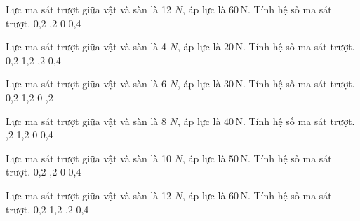 \begin{ex}
Lực ma sát trượt giữa vật và sàn là 12 $N$, áp lực là $60\,\text{N}$. Tính hệ số ma sát trượt.
\choice
{0,2}
{,2}
{0}
{0,4}
\end{ex}

\begin{ex}
Lực ma sát trượt giữa vật và sàn là 4 $N$, áp lực là $20\,\text{N}$. Tính hệ số ma sát trượt.
\choice
{0,2}
{1,2}
{,2}
{0,4}
\end{ex}

\begin{ex}
Lực ma sát trượt giữa vật và sàn là 6 $N$, áp lực là $30\,\text{N}$. Tính hệ số ma sát trượt.
\choice
{0,2}
{1,2}
{0}
{,2}
\end{ex}

\begin{ex}
Lực ma sát trượt giữa vật và sàn là 8 $N$, áp lực là $40\,\text{N}$. Tính hệ số ma sát trượt.
\choice
{,2}
{1,2}
{0}
{0,4}
\end{ex}

\begin{ex}
Lực ma sát trượt giữa vật và sàn là 10 $N$, áp lực là $50\,\text{N}$. Tính hệ số ma sát trượt.
\choice
{0,2}
{,2}
{0}
{0,4}
\end{ex}

\begin{ex}
Lực ma sát trượt giữa vật và sàn là 12 $N$, áp lực là $60\,\text{N}$. Tính hệ số ma sát trượt.
\choice
{0,2}
{1,2}
{,2}
{0,4}
\end{ex}

